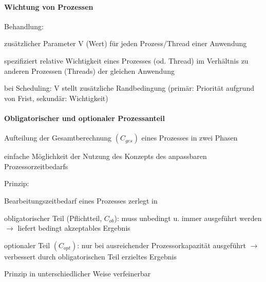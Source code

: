 \documentclass[a4paper]{article}
\begin{document}
\begin{multicols}{3}
    \paragraph{Wichtung von Prozessen}

    Behandlung:

    \begin{itemize*}
        \item zusätzlicher Parameter V (Wert) für jeden Prozess/Thread einer
        Anwendung
        \item spezifiziert relative Wichtigkeit eines Prozesses (od. Thread) im
        Verhältnis zu anderen Prozessen (Threads) der gleichen Anwendung
        \item bei Scheduling: V stellt zusätzliche Randbedingung (primär: Priorität
        aufgrund von Frist, sekundär: Wichtigkeit)
    \end{itemize*}


    \paragraph{Obligatorischer und optionaler
        Prozessanteil}

    \begin{itemize*}
        \item Aufteilung der Gesamtberechnung $(C_{ges})$ eines Prozesses in
        zwei Phasen
        \item einfache Möglichkeit der Nutzung des Konzepts des anpassbaren
        Prozessorzeitbedarfs
        \item Prinzip:
        \begin{itemize*}
            \item Bearbeitungszeitbedarf eines Prozesses zerlegt in \begin{enumerate*} \item obligatorischer Teil (Pflichtteil, $C_{ob}$): muss unbedingt u. immer ausgeführt werden $\rightarrow$ liefert bedingt akzeptables Ergebnis \item optionaler Teil $(C_{opt})$: nur bei ausreichender Prozessorkapazität ausgeführt $\rightarrow$ verbessert durch obligatorischen Teil erzieltes Ergebnis \end{enumerate*}
            \item Prinzip in unterschiedlicher Weise verfeinerbar
        \end{itemize*}
    \end{itemize*}



\end{multicols}
\end{document}
